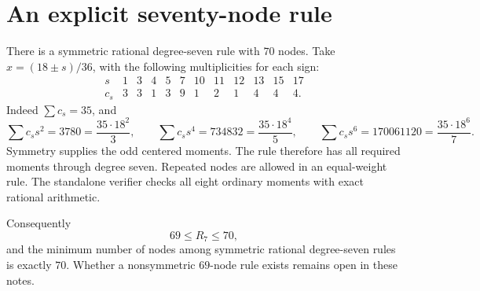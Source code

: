 \documentclass[11pt]{article}
\begin{document}
\section*{An explicit seventy-node rule}
There is a symmetric rational degree-seven rule with $70$ nodes.
Take $x=(18\pm s)/36$, with the following multiplicities for each sign:
\[
\begin{array}{c|rrrrrrrrrrr}
s&1&3&4&5&7&10&11&12&13&15&17\\\hline
c_s&3&3&1&3&9&1&2&1&4&4&4.
\end{array}
\]
Indeed $\sum c_s=35$, and
\[
 \sum c_ss^2=3780=\frac{35\cdot18^2}{3},\qquad
 \sum c_ss^4=734832=\frac{35\cdot18^4}{5},\qquad
 \sum c_ss^6=170061120=\frac{35\cdot18^6}{7}.
\]
Symmetry supplies the odd centered moments. The rule therefore has all
required moments through degree seven. Repeated nodes are allowed in
an equal-weight rule. The standalone verifier
 checks all eight ordinary moments with
exact rational arithmetic.

Consequently
\[
 \boxed{69\le R_7\le70},
\]
and the minimum number of nodes among symmetric rational degree-seven
rules is exactly $70$. Whether a nonsymmetric $69$-node rule exists
remains open in these notes.
\end{document}
